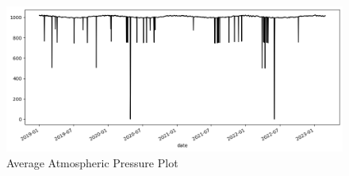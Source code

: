  \begin{figure}[htbp]
     \centering
     \includegraphics[width=0.8\linewidth]{images/outputs/atm_avg.png}
     \caption{ Average Atmospheric Pressure Plot}
 \end{figure}



